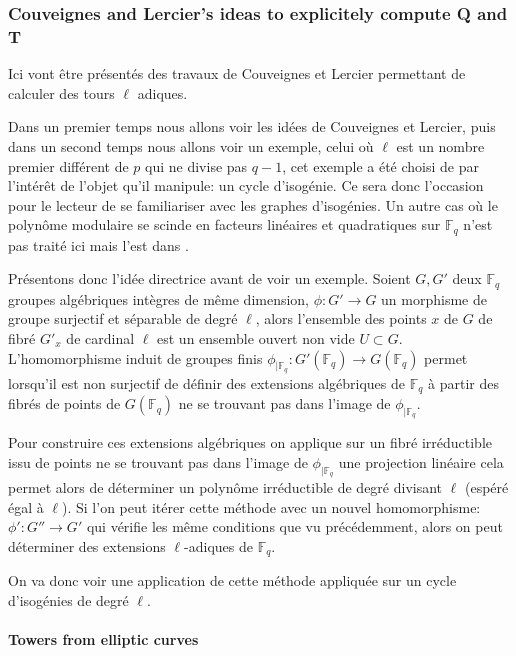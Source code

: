 \documentclass[10pt,a4paper]{book}
\theoremstyle{plain}
\theoremstyle{definition}
\theoremstyle{definition}
\theoremstyle{definition}
\theoremstyle{definition}
\theoremstyle{remark}
\theoremstyle{remark}
\theoremstyle{definition}
\begin{document}
\subsubsection{Couveignes and Lercier's ideas to explicitely compute Q and T}
Ici vont être présentés des travaux de Couveignes et Lercier \cite{couveignesLercier2013} permettant de calculer des tours $\ell$ adiques.

Dans un premier temps nous allons voir les idées de Couveignes et Lercier, puis dans un second temps nous allons voir un exemple, celui où $\ell$ est un nombre premier différent de $p$ qui ne divise pas $q-1$, cet exemple a été choisi de par l'intérêt de l'objet qu'il manipule: un cycle d'isogénie. Ce sera donc l'occasion pour le lecteur de se familiariser avec les graphes d'isogénies. Un autre cas où le polynôme modulaire se scinde en facteurs linéaires et quadratiques sur $\mathbb{F}_q$ n'est pas traité ici mais l'est dans \cite{DeFeo-Doliskani-Schost13}.

Présentons donc l'idée directrice avant de voir un exemple. Soient $G,G'$ deux $\mathbb{F}_q$ groupes algébriques intègres de même dimension, $\phi: G' \to G$ un morphisme de groupe surjectif et séparable de degré $\ell$, alors l'ensemble des points $x$ de $G$ de fibré $G'_x$ de cardinal $\ell$ est un ensemble ouvert non vide $U \subset G$. 
L'homomorphisme induit de groupes finis $\phi_{\mid \mathbb{F}_q}: G'(\mathbb{F}_q) \to G(\mathbb{F}_q)$ permet lorsqu'il est non surjectif de définir des extensions algébriques de $\mathbb{F}_q$ à partir des fibrés de points de $G(\mathbb{F}_q)$ ne se trouvant pas dans l'image de $\phi_{\mid \mathbb{F}_q}$. 

Pour construire ces extensions algébriques on applique sur un fibré irréductible issu de points ne se trouvant pas dans l'image de $\phi_{\mid \mathbb{F}_q}$ une projection linéaire cela permet alors de  déterminer un polynôme irréductible de degré divisant $\ell$ (espéré égal à $\ell$). Si l'on peut itérer cette méthode avec un nouvel homomorphisme: $\phi':G'' \to G'$ qui vérifie les même conditions que vu précédemment, alors on peut déterminer des extensions $\ell$-adiques de $\mathbb{F}_q$.

On va donc voir une application de cette méthode appliquée sur un cycle d'isogénies de degré $\ell$.

\paragraph{Towers from elliptic curves}
\end{document}
